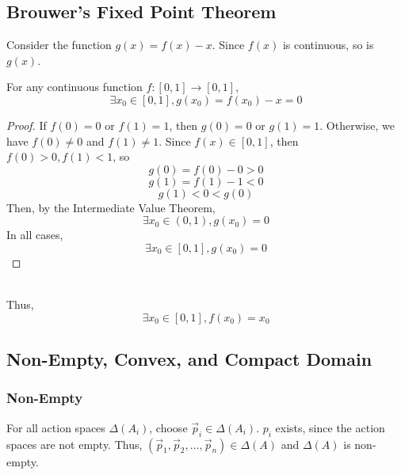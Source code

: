 \subsection{Brouwer's Fixed Point Theorem}

Consider the function $g(x)=f(x)-x$.
Since $f(x)$ is continuous, so is $g(x)$.
\begin{claim}
For any continuous function $f:[0,1]\rightarrow [0,1]$,
    \[\exists x_0\in [0,1], g(x_0) = f(x_0)-x = 0\]
\end{claim}
\begin{proof}
    If $f(0)=0$ or $f(1)=1$, then $g(0)=0$ or $g(1)=1$.
    Otherwise, we have $f(0)\neq 0$ and $f(1) \neq 1$.
    Since $f(x)\in [0,1]$, then $f(0) > 0,f(1) < 1$, so
    \[g(0) = f(0)-0>0\]
    \[g(1) = f(1)-1<0\]
    \[g(1)<0<g(0)\]
    Then, by the Intermediate Value Theorem,
    \[\exists x_0 \in (0,1), g(x_0) = 0\]
    In all cases,
    \[\exists x_0 \in [0,1], g(x_0) = 0\]
\end{proof}\\
Thus,
\[\exists x_0 \in [0,1], f(x_0)=x_0\]

\newpage
\subsection{Non-Empty, Convex, and Compact Domain}

\subsubsection{Non-Empty}
For all action spaces $\Delta(A_i)$, choose $\vec{p}_i\in\Delta(A_i)$.
$p_i$ exists, since the action spaces are not empty.
Thus, $(\vec{p}_1,\vec{p}_2,\dots,\vec{p}_n)\in\Delta(A)$ and $\Delta(A)$ is non-empty.

